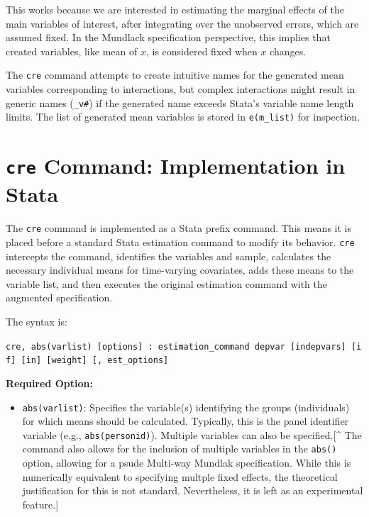 \documentclass[bib]{statapress}
\providecommand{\tightlist}{%
  \setlength{\itemsep}{0pt}\setlength{\parskip}{0pt}}\usepackage{longtable,booktabs,array}
\begin{document}
This works because we are interested in estimating the marginal effects
of the main variables of interest, after integrating over the unobserved
errors, which are assumed fixed. In the Mundlack specification
perspective, this implies that created variables, like mean of \(x\), is
considered fixed when \(x\) changes.

The \texttt{cre} command attempts to create intuitive names for the
generated mean variables corresponding to interactions, but complex
interactions might result in generic names (\texttt{\_v\#}) if the
generated name exceeds Stata's variable name length limits. The list of
generated mean variables is stored in \texttt{e(m\_list)} for
inspection.

\section{\texorpdfstring{\texttt{cre} Command: Implementation in
Stata}{cre Command: Implementation in Stata}}\label{sec-3}

The \texttt{cre} command is implemented as a Stata prefix command. This
means it is placed before a standard Stata estimation command to modify
its behavior. \texttt{cre} intercepts the command, identifies the
variables and sample, calculates the necessary individual means for
time-varying covariates, adds these means to the variable list, and then
executes the original estimation command with the augmented
specification.

The syntax is:

\texttt{cre,\ abs(varlist)\ {[}options{]}\ :\ estimation\_command\ depvar\ {[}indepvars{]}\ {[}if{]}\ {[}in{]}\ {[}weight{]}\ {[},\ est\_options{]}}

\textbf{Required Option:}

\begin{itemize}
\tightlist
\item
  \texttt{abs(varlist)}: Specifies the variable(s) identifying the
  groups (individuals) for which means should be calculated. Typically,
  this is the panel identifier variable (e.g., \texttt{abs(personid)}).
  Multiple variables can also be specified.{[}\^{} The command also
  allows for the inclusion of multiple variables in the \texttt{abs()}
  option, allowing for a psude Multi-way Mundlak specification. While
  this is numerically equivalent to specifying multple fixed effects,
  the theoretical justification for this is not standard. Nevertheless,
  it is left as an experimental feature.{]}
\end{itemize}
\end{document}
